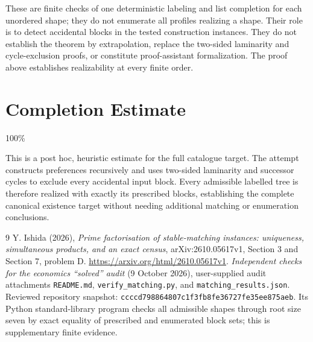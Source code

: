 \documentclass[11pt]{article}
\theoremstyle{definition}
\begin{document}
These are finite checks of one deterministic labeling and list completion for each unordered shape; they do not enumerate all profiles realizing a shape. Their role is to detect accidental blocks in the tested construction instances. They do not establish the theorem by extrapolation, replace the two-sided laminarity and cycle-exclusion proofs, or constitute proof-assistant formalization. The proof above establishes realizability at every finite order.

\section{Completion Estimate}
100\%

This is a post hoc, heuristic estimate for the full catalogue target.
The attempt constructs preferences recursively and uses two-sided laminarity and successor cycles to exclude every accidental input block. Every admissible labelled tree is therefore realized with exactly its prescribed blocks, establishing the complete canonical existence target without needing additional matching or enumeration conclusions.

\begin{thebibliography}{9}
 Y. Ishida (2026), \emph{Prime factorisation of
stable-matching instances: uniqueness, simultaneous products, and an
exact census}, arXiv:2610.05617v1, Section 3 and Section 7, problem D.
\url{https://arxiv.org/html/2610.05617v1}.
 \emph{Independent checks for the economics ``solved'' audit} (9 October 2026), user-supplied audit attachments \texttt{README.md}, \texttt{verify\_matching.py}, and \texttt{matching\_results.json}. Reviewed repository snapshot: \texttt{ccccd798864807c1f3fb8fe36727fe35ee875aeb}. Its Python standard-library program checks all admissible shapes through root size seven by exact equality of prescribed and enumerated block sets; this is supplementary finite evidence.
\end{thebibliography}
\end{document}
